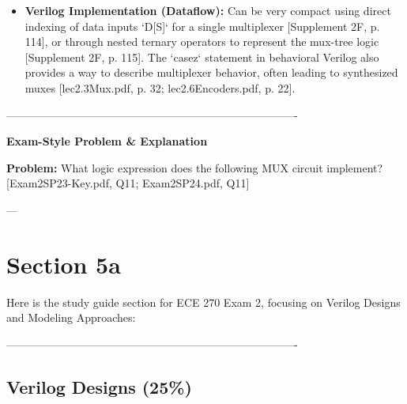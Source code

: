 \documentclass{article}
\begin{document}
\begin{itemize}
\begin{itemize}
        \item \textbf{Verilog Implementation (Dataflow):} Can be very compact using direct indexing of data inputs `D[S]` for a single multiplexer [Supplement 2F, p. 114], or through nested ternary operators to represent the mux-tree logic [Supplement 2F, p. 115]. The `casez` statement in behavioral Verilog also provides a way to describe multiplexer behavior, often leading to synthesized muxes [lec2.3Mux.pdf, p. 32; lec2.6Encoders.pdf, p. 22].
    \end{itemize}
\end{itemize}

\-------------------------------------------------------------------------------- 

\textbf{Exam-Style Problem \& Explanation}

\textbf{Problem:} What logic expression does the following MUX circuit implement? [Exam2SP23-Key.pdf, Q11; Exam2SP24.pdf, Q11]


---

\section{Section 5a}

Here is the study guide section for ECE 270 Exam 2, focusing on Verilog Designs and Modeling Approaches:

\-------------------------------------------------------------------------------- 

\subsection{Verilog Designs (25\%)}
\end{document}
